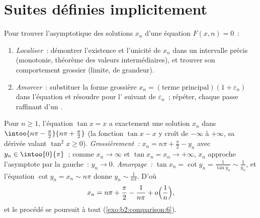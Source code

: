 \section{Suites définies implicitement}

\begin{method}\label{met:b2:comparison:implicit}
Pour trouver l'asymptotique des solutions $x_n$ d'une équation $F(x, n) =
0$~:
\begin{enumerate}
  \item \emph{Localiser}~: démontrer l'existence et l'unicité de $x_n$
        dans un intervalle précis (monotonie, théorème des valeurs
        intermédiaires), et trouver son comportement grossier (limite,
         de grandeur).
  \item \emph{Amorcer}~: substituer la forme grossière $x_n = (\text{terme
        principal})(1 + \varepsilon_n)$ dans l'équation et résoudre
        pour l' suivant de $\varepsilon_n$~; répéter, chaque passe
        raffinant d'un .
\end{enumerate}
\end{method}

\begin{example}\label{ex:b2:comparison:tan}
Pour $n \geq 1$, l'équation $\tan x = x$ a exactement une solution
$x_n$ dans $\intoo{n\pi - \frac\pi2}{n\pi + \frac\pi2}$ (la fonction
$\tan x - x$ y croît de $-\infty$ à $+\infty$, sa dérivée valant
$\tan^2 x \geq 0$). \emph{Grossièrement~:} $x_n = n\pi +
\frac\pi2 - y_n$ avec $y_n \in \intoo{0}{\pi}$~; comme $x_n \to
\infty$ et $\tan x_n = x_n \to +\infty$, $x_n$ approche l'asymptote
par la gauche~: $y_n \to 0$. \emph{Amorçage~:} $\tan x_n =
\cot y_n = \frac{1}{\tan y_n} \sim \frac{1}{y_n}$, et l'équation
$\cot y_n = x_n \sim n\pi$ donne $y_n \sim \frac{1}{n\pi}$. D'où
\[
x_n = n\pi + \frac\pi2 - \frac{1}{n\pi} +
o\Bigl(\frac1n\Bigr),
\]
et le procédé se poursuit à tout 
(\cref{exo:b2:comparison:6}).
\end{example}

